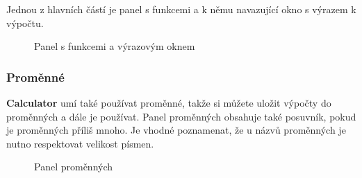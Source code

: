 \documentclass[a4paper, 11pt]{article}
\begin{document}
Jednou z hlavních částí je panel s funkcemi a k němu navazující okno s
výrazem k výpočtu.

\begin{figure}[H]
    \centering
    \caption{Panel s funkcemi a výrazovým oknem}
\end{figure}

\subsubsection{Proměnné}

\textbf{Calculator} umí také používat proměnné, takže si můžete uložit výpočty do
proměnných a dále je používat. Panel proměnných obsahuje také posuvník,
pokud je proměnných příliš mnoho. Je vhodné poznamenat, že u názvů proměnných je nutno respektovat velikost písmen. 

\begin{figure}[H]
    \centering
    \caption{Panel proměnných}
\end{figure}
\end{document}
